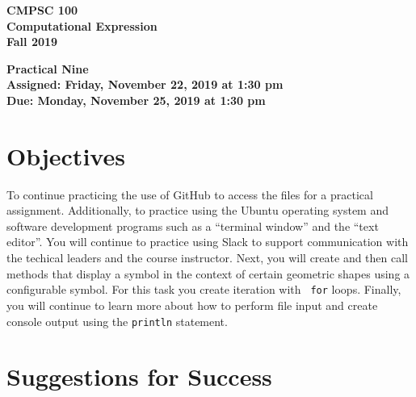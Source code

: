 \documentclass[11pt]{article}
\newcommand{\assignmentduedate}{November 25}
\newcommand{\assignmentassignedate}{November 22}
\newcommand{\assignmentnumber}{Nine}
\newcommand{\labyear}{2019}
\newcommand{\labdueday}{Monday}
\newcommand{\labassignday}{Friday}
\newcommand{\labtime}{1:30 pm}
\newcommand{\assigneddate}{Assigned: \labassignday, \assignmentassignedate, \labyear{} at \labtime{}}
\newcommand{\duedate}{Due: \labdueday, \assignmentduedate, \labyear{} at \labtime{}}
\newcommand{\labtitle}[1]
{
  \begin{center}
    \begin{center}
      \bf
      CMPSC 100\\Computational Expression\\
      Fall 2019\\
      \medskip
    \end{center}
    \bf
    #1
  \end{center}
}
\begin{document}
\thispagestyle{empty}

\labtitle{Practical \assignmentnumber{} \\ \assigneddate{} \\ \duedate{}}

\section*{Objectives}

To continue practicing the use of GitHub to access the files for a practical
assignment. Additionally, to practice using the Ubuntu operating system and
software development programs such as a ``terminal window'' and the ``text
editor''. You will continue to practice using Slack to support communication
with the techical leaders and the course instructor. Next, you will create
and then call methods that display a symbol in the context of certain geometric
shapes using a configurable symbol. For this task you create iteration with {\tt
for} loops. Finally, you will continue to learn more about how to perform file
input and create console output using the {\tt println} statement.

\section*{Suggestions for Success}
\end{document}
